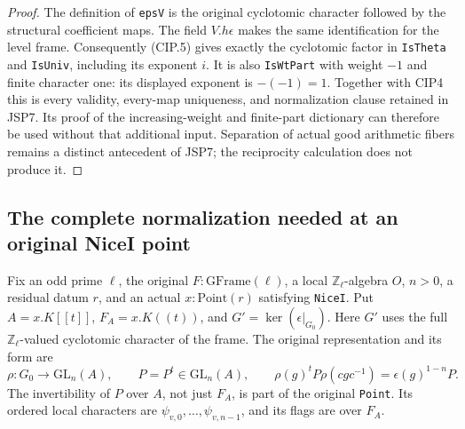 \begin{proof}
The definition of \texttt{epsV} is the original cyclotomic character
followed by the structural coefficient maps.  The field
$V.h\epsilon$ makes the same identification for the level frame.
Consequently (CIP.5) gives exactly the cyclotomic factor in
\texttt{IsTheta} and \texttt{IsUniv}, including its exponent $i$.
It is also \texttt{IsWtPart} with weight $-1$ and finite character
one: its displayed exponent is $-(-1)=1$.  Together with CIP4 this
is every validity, every-map uniqueness, and normalization clause
retained in JSP7.  Its proof of the increasing-weight and finite-part
dictionary can therefore be used without that additional input.
Separation of actual good arithmetic fibers remains a distinct
antecedent of JSP7; the reciprocity calculation does not produce it.
\end{proof}

\subsection{The complete normalization needed at an original NiceI point}

Fix an odd prime $\ell$, the original $F:\mathrm{GFrame}(\ell)$,
a local $\mathbb Z_\ell$-algebra $O$, $n>0$, a residual datum $r$,
and an actual $x:\mathrm{Point}(r)$ satisfying \texttt{NiceI}.
Put $A=x.K[[t]]$, $F_A=x.K((t))$, and
$G'=\ker(\epsilon|_{G_0})$.  Here $G'$ uses the full
$\mathbb Z_\ell$-valued cyclotomic character of the frame.
The original representation and its form are
\[
 \rho:G_0\longrightarrow\mathrm{GL}_n(A),\qquad
 P=P^t\in\mathrm{GL}_n(A),\qquad
 \rho(g)^tP\rho(cgc^{-1})=\epsilon(g)^{1-n}P.       \tag{CIP.6}
\]
The invertibility of $P$ over $A$, not just $F_A$, is part of
the original \texttt{Point}.  Its ordered local characters are
$\psi_{v,0},\ldots,\psi_{v,n-1}$, and its flags are over $F_A$.

